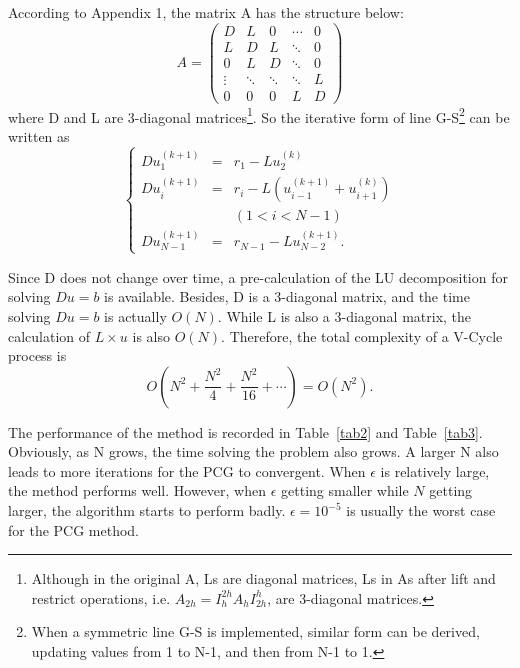 \documentclass{article}
\begin{document}
According to Appendix 1, the matrix A has the structure below:
\begin{displaymath}
  A=
  \left(
    \begin{array}{ccccc}
      D & L & 0 & \cdots & 0 \\
      L & D & L & \ddots & 0 \\
      0 & L & D & \ddots & 0 \\
      \vdots & \ddots & \ddots & \ddots & L \\
      0 & 0 & 0 & L & D
    \end{array}
  \right)
\end{displaymath}
where D and L are 3-diagonal matrices\footnote{Although in the original A, Ls are diagonal matrices, Ls in As after lift and restrict operations, i.e. $A_{2h}=I_{h}^{2h}A_{h}I_{2h}^{h}$, are 3-diagonal matrices. }. So the iterative form of line G-S\footnote{When a symmetric line G-S is implemented, similar form can be derived, updating values from 1 to N-1, and then from N-1 to 1.} can be written as
\begin{displaymath}
    \left\{
      \begin{array}{lcl}
          Du_1^{(k+1)} &=& r_1-Lu_2^{(k)} \\
          Du_i^{(k+1)} &=& r_i-L(u_{i-1}^{(k+1)}+u_{i+1}^{(k)}) \\
          & & (1<i<N-1) \\
          Du_{N-1}^{(k+1)} &=& r_{N-1}-Lu_{N-2}^{(k+1)}.
      \end{array}
    \right.
\end{displaymath}

Since D does not change over time, a pre-calculation of the LU decomposition for solving $Du=b$ is available. Besides, D is a 3-diagonal matrix, and the time solving $Du=b$ is actually $O(N)$. While L is also a 3-diagonal matrix, the calculation of $L\times u$ is also $O(N)$. Therefore, the total complexity of a V-Cycle process is
\begin{displaymath}
  O(N^2+\frac{N^2}{4}+\frac{N^2}{16}+\cdots)=O(N^2).
\end{displaymath}

The performance of the method is recorded in Table~\ref{tab2} and Table~\ref{tab3}. Obviously, as N grows, the time solving the problem also grows. A larger N also leads to more iterations for the PCG to convergent. When $\epsilon$ is relatively large, the method performs well. However, when $\epsilon$ getting smaller while $N$ getting larger, the algorithm starts to perform badly. $\epsilon=10^{-5}$ is usually the worst case for the PCG method.
\end{document}
